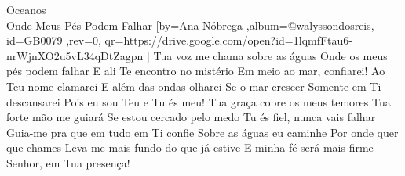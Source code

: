 \beginsong
{Oceanos \\ Onde Meus Pés Podem Falhar %
}[by={Ana Nóbrega %
},album={@walyssondosreis},
id={GB0079 %
},rev={0}, %
qr={https://drive.google.com/open?id=1lqmfFtau6-nrWjnXO2u5vL34qDtZagpn %
}]
\beginverse*
Tua voz me chama sobre as águas
Onde os meus pés podem falhar
E ali Te encontro no mistério
Em meio ao mar, confiarei!
\endverse
\beginchorus
Ao Teu nome clamarei
E além das ondas olharei
Se o mar crescer
Somente em Ti descansarei
Pois eu sou Teu e Tu és meu!
\endchorus
\beginverse*
Tua graça cobre os meus temores
Tua forte mão me guiará
Se estou cercado pelo medo
Tu és fiel, nunca vais falhar
\endverse
\beginverse*
Guia-me pra que em tudo em Ti confie
Sobre as águas eu caminhe
Por onde quer que chames
Leva-me mais fundo do que já estive
E minha fé será mais firme
Senhor, em Tua presença!
\endverse



